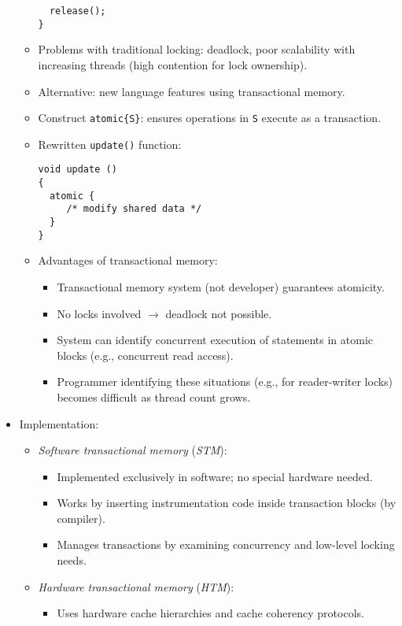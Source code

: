 \begin{itemize}
\begin{itemize}
\begin{verbatim}
  release();
}
        \end{verbatim}
        \item Problems with traditional locking: deadlock, poor scalability with increasing threads (high contention for lock ownership).
        \item Alternative: new language features using transactional memory.
        \item Construct \texttt{atomic\{S\}}: ensures operations in \texttt{S} execute as a transaction.
        \item Rewritten \texttt{update()} function:
        \begin{verbatim}
void update ()
{
  atomic {
     /* modify shared data */
  }
}
        \end{verbatim}
        \item Advantages of transactional memory:
        \begin{itemize}
            \item Transactional memory system (not developer) guarantees atomicity.
            \item No locks involved $\rightarrow$ deadlock not possible.
            \item System can identify concurrent execution of statements in atomic blocks (e.g., concurrent read access).
            \item Programmer identifying these situations (e.g., for reader-writer locks) becomes difficult as thread count grows.
        \end{itemize}
    \end{itemize}
    \item Implementation:
    \begin{itemize}
        \item \textit{Software transactional memory} (\textit{STM}):
        \begin{itemize}
            \item Implemented exclusively in software; no special hardware needed.
            \item Works by inserting instrumentation code inside transaction blocks (by compiler).
            \item Manages transactions by examining concurrency and low-level locking needs.
        \end{itemize}
        \item \textit{Hardware transactional memory} (\textit{HTM}):
        \begin{itemize}
            \item Uses hardware cache hierarchies and cache coherency protocols.

\end{itemize}
\end{itemize}
\end{itemize}
